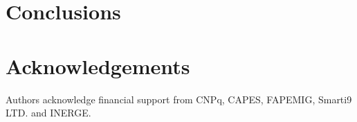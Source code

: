 \documentclass[journal]{IEEEtran}
\begin{document}
\section{Conclusions}
% 

\section*{Acknowledgements}
Authors acknowledge financial support from CNPq, CAPES, FAPEMIG, Smarti9 LTD. and INERGE.




\end{document}
